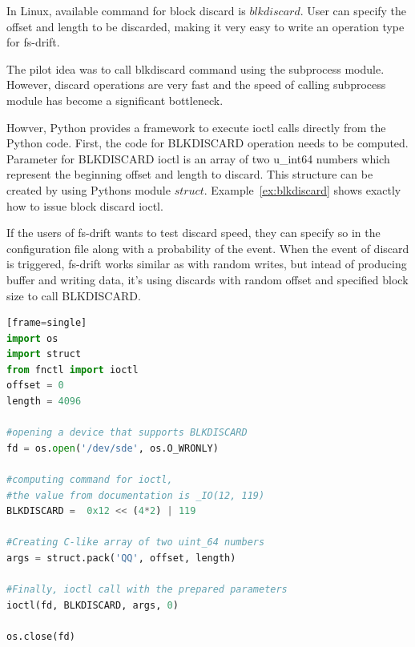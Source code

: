 \documentclass[
  color, %
  table, %
  lof,   %
  lot,   %
]{fithesis3}
\begin{document}
In Linux, available command for block discard is $blkdiscard$. User can specify the offset and length to be discarded, making it very easy to write an operation type for fs-drift.

The pilot idea was to call blkdiscard command using the subprocess module. However, discard operations are very fast and the speed of calling subprocess module has become a significant bottleneck.

Howver, Python provides a framework to execute ioctl calls directly from the Python code. First, the code for BLKDISCARD operation needs to be computed. Parameter for BLKDISCARD ioctl is an array of two u\_int64 numbers which represent the beginning offset and length to discard. This structure can be created by using Pythons module $struct$. Example~\ref{ex:blkdiscard} shows exactly how to issue block discard ioctl.

If the users of fs-drift wants to test discard speed, they can specify so in the configuration file along with a probability of the event. When the event of discard is triggered, fs-drift works similar as with random writes, but intead of producing buffer and writing data, it's using discards with random offset and specified block size to call BLKDISCARD.




\begin{lstlisting}[language=Python, caption={Using BLKDISCARD ioctl to discard first 4096 bytes of a device /dev/sde},label={ex:blkdiscard}][frame=single]
import os
import struct
from fnctl import ioctl
offset = 0
length = 4096

#opening a device that supports BLKDISCARD
fd = os.open('/dev/sde', os.O_WRONLY)    

#computing command for ioctl,
#the value from documentation is _IO(12, 119)
BLKDISCARD =  0x12 << (4*2) | 119

#Creating C-like array of two uint_64 numbers
args = struct.pack('QQ', offset, length)

#Finally, ioctl call with the prepared parameters
ioctl(fd, BLKDISCARD, args, 0)

os.close(fd)
\end{lstlisting}
\end{document}

